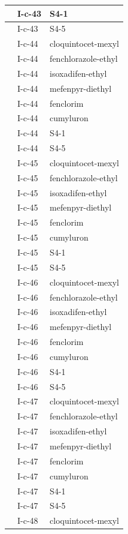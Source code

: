 \documentclass[11pt,a4paper]{article}
\begin{document}
\begin{table}[h]
\begin{tabular}{|l|l|l|}
 & I-c-43 & S4-1 \\ \hline
 & I-c-43 & S4-5 \\ \hline
 & I-c-44 & cloquintocet-mexyl \\ \hline
 & I-c-44 & fenchlorazole-ethyl \\ \hline
 & I-c-44 & isoxadifen-ethyl \\ \hline
 & I-c-44 & mefenpyr-diethyl \\ \hline
 & I-c-44 & fenclorim \\ \hline
 & I-c-44 & cumyluron \\ \hline
 & I-c-44 & S4-1 \\ \hline
 & I-c-44 & S4-5 \\ \hline
 & I-c-45 & cloquintocet-mexyl \\ \hline
 & I-c-45 & fenchlorazole-ethyl \\ \hline
 & I-c-45 & isoxadifen-ethyl \\ \hline
 & I-c-45 & mefenpyr-diethyl \\ \hline
 & I-c-45 & fenclorim \\ \hline
 & I-c-45 & cumyluron \\ \hline
 & I-c-45 & S4-1 \\ \hline
 & I-c-45 & S4-5 \\ \hline
 & I-c-46 & cloquintocet-mexyl \\ \hline
 & I-c-46 & fenchlorazole-ethyl \\ \hline
 & I-c-46 & isoxadifen-ethyl \\ \hline
 & I-c-46 & mefenpyr-diethyl \\ \hline
 & I-c-46 & fenclorim \\ \hline
 & I-c-46 & cumyluron \\ \hline
 & I-c-46 & S4-1 \\ \hline
 & I-c-46 & S4-5 \\ \hline
 & I-c-47 & cloquintocet-mexyl \\ \hline
 & I-c-47 & fenchlorazole-ethyl \\ \hline
 & I-c-47 & isoxadifen-ethyl \\ \hline
 & I-c-47 & mefenpyr-diethyl \\ \hline
 & I-c-47 & fenclorim \\ \hline
 & I-c-47 & cumyluron \\ \hline
 & I-c-47 & S4-1 \\ \hline
 & I-c-47 & S4-5 \\ \hline
 & I-c-48 & cloquintocet-mexyl \\ \hline

\end{tabular}
\end{table}
\end{document}
